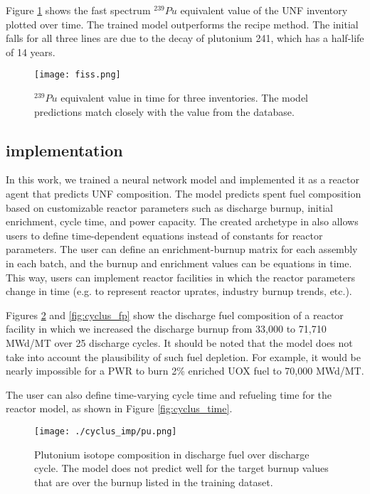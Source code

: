 Figure \ref{fig:fiss} shows the fast spectrum $^{239}Pu$ equivalent
value of the \gls{UNF} inventory plotted over time.
The trained model outperforms the recipe method. The
initial falls for all three lines are due to the
decay of plutonium 241, which has a half-life of
14 years.


\begin{figure}
    \centering
    \texttt{[image: fiss.png]}
    \caption{$^{239}Pu$ equivalent value in time for three
             inventories. The model predictions match closely
             with the value from the database.}
    \label{fig:fiss}
\end{figure}




\subsection{\Cyclus implementation}

In this work, we trained a neural
network model and implemented it as a  \Cyclus reactor
agent that predicts \gls{UNF} composition. The model predicts spent
fuel composition
based on customizable reactor parameters such as
discharge burnup, initial enrichment, cycle time, and power
capacity. The created archetype in \Cyclus also allows users to define
time-dependent
equations instead of constants for reactor parameters.
The user can define an enrichment-burnup matrix for
each assembly in each batch, and the burnup and enrichment
values can be equations in time. This way, users can
implement reactor facilities in which the reactor parameters
change in time (e.g. to represent reactor uprates, industry
burnup trends, etc.).

Figures \ref{fig:cyclus_pu}
and \ref{fig:cyclus_fp} show the discharge fuel composition
of a reactor facility in which we increased the discharge burnup
from 33,000 to 71,710 MWd/MT over 25 discharge cycles.
It should be noted that the model does not take into account
the plausibility of such fuel depletion. For example, it
would be nearly impossible for a  \gls{PWR} to burn 2\%
enriched \gls{UOX} fuel to 70,000 MWd/MT.

The user can also define time-varying
cycle time and refueling time for the reactor model, as shown
in Figure \ref{fig:cyclus_time}.


\begin{figure}
    \centering
    \texttt{[image: ./cyclus\_imp/pu.png]}
    \caption{Plutonium isotope composition in discharge fuel over discharge cycle. The model does not predict well for the target burnup values
    that are over the burnup listed in the training dataset.}
    \label{fig:cyclus_pu}
\end{figure}


